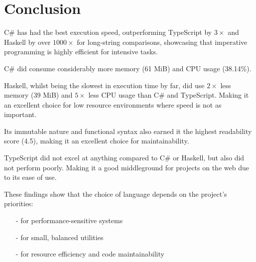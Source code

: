 \section{Conclusion}

C\# has had the best execution speed, outperforming TypeScript by $3 \times$ and Haskell by over $1000 \times$ for long-string comparisons,
showcasing that imperative programming is highly efficient for intensive tasks.

C\# did consume considerably more memory (61 MiB) and CPU usage (38.14\%).

Haskell, whilst being the slowest in execution time by far,
did use $2 \times$ less memory (39 MiB) and  $5 \times$ less CPU usage than C\# and TypeScript.
Making it an excellent choice for low resource environments where speed is not as important.

Its immutable nature and functional syntax also earned it the highest readability score (4.5),
making it an excellent choice for maintainability.

TypeScript did not excel at anything compared to C\# or Haskell,
but also did not perform poorly. Making it a good middleground for projects
on the web due to its ease of use.

These findings show that the choice of language depends on the project's priorities:
\begin{itemize}
  \item[-]  for performance-sensitive systems
  \item[-]  for small, balanced utilities
  \item[-]  for resource efficiency and code maintainability
\end{itemize}
